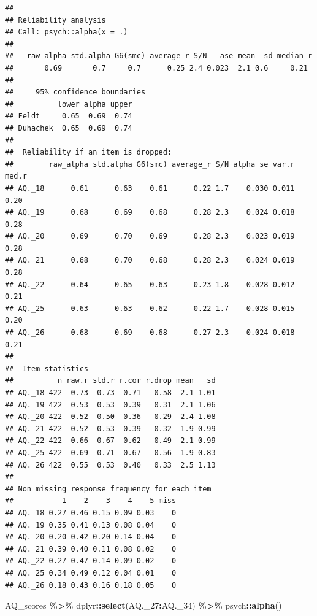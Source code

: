 \documentclass[
]{article}
\newenvironment{Shaded}{\begin{snugshade}}{\end{snugshade}}
\newcommand{\FunctionTok}[1]{\textcolor[rgb]{0.13,0.29,0.53}{\textbf{#1}}}
\newcommand{\NormalTok}[1]{#1}
\newcommand{\SpecialCharTok}[1]{\textcolor[rgb]{0.81,0.36,0.00}{\textbf{#1}}}
\begin{document}
\begin{verbatim}
## 
## Reliability analysis   
## Call: psych::alpha(x = .)
## 
##   raw_alpha std.alpha G6(smc) average_r S/N   ase mean  sd median_r
##       0.69       0.7     0.7      0.25 2.4 0.023  2.1 0.6     0.21
## 
##     95% confidence boundaries 
##          lower alpha upper
## Feldt     0.65  0.69  0.74
## Duhachek  0.65  0.69  0.74
## 
##  Reliability if an item is dropped:
##        raw_alpha std.alpha G6(smc) average_r S/N alpha se var.r med.r
## AQ._18      0.61      0.63    0.61      0.22 1.7    0.030 0.011  0.20
## AQ._19      0.68      0.69    0.68      0.28 2.3    0.024 0.018  0.28
## AQ._20      0.69      0.70    0.69      0.28 2.3    0.023 0.019  0.28
## AQ._21      0.68      0.70    0.68      0.28 2.3    0.024 0.019  0.28
## AQ._22      0.64      0.65    0.63      0.23 1.8    0.028 0.012  0.21
## AQ._25      0.63      0.63    0.62      0.22 1.7    0.028 0.015  0.20
## AQ._26      0.68      0.69    0.68      0.27 2.3    0.024 0.018  0.21
## 
##  Item statistics 
##          n raw.r std.r r.cor r.drop mean   sd
## AQ._18 422  0.73  0.73  0.71   0.58  2.1 1.01
## AQ._19 422  0.53  0.53  0.39   0.31  2.1 1.06
## AQ._20 422  0.52  0.50  0.36   0.29  2.4 1.08
## AQ._21 422  0.52  0.53  0.39   0.32  1.9 0.99
## AQ._22 422  0.66  0.67  0.62   0.49  2.1 0.99
## AQ._25 422  0.69  0.71  0.67   0.56  1.9 0.83
## AQ._26 422  0.55  0.53  0.40   0.33  2.5 1.13
## 
## Non missing response frequency for each item
##           1    2    3    4    5 miss
## AQ._18 0.27 0.46 0.15 0.09 0.03    0
## AQ._19 0.35 0.41 0.13 0.08 0.04    0
## AQ._20 0.20 0.42 0.20 0.14 0.04    0
## AQ._21 0.39 0.40 0.11 0.08 0.02    0
## AQ._22 0.27 0.47 0.14 0.09 0.02    0
## AQ._25 0.34 0.49 0.12 0.04 0.01    0
## AQ._26 0.18 0.43 0.16 0.18 0.05    0
\end{verbatim}

\begin{Shaded}
\begin{Highlighting}[]
\NormalTok{AQ\_scores }\SpecialCharTok{\%\textgreater{}\%}\NormalTok{ dplyr}\SpecialCharTok{::}\FunctionTok{select}\NormalTok{(AQ.\_27}\SpecialCharTok{:}\NormalTok{AQ.\_34) }\SpecialCharTok{\%\textgreater{}\%}\NormalTok{ psych}\SpecialCharTok{::}\FunctionTok{alpha}\NormalTok{()}
\end{Highlighting}
\end{Shaded}
\end{document}
